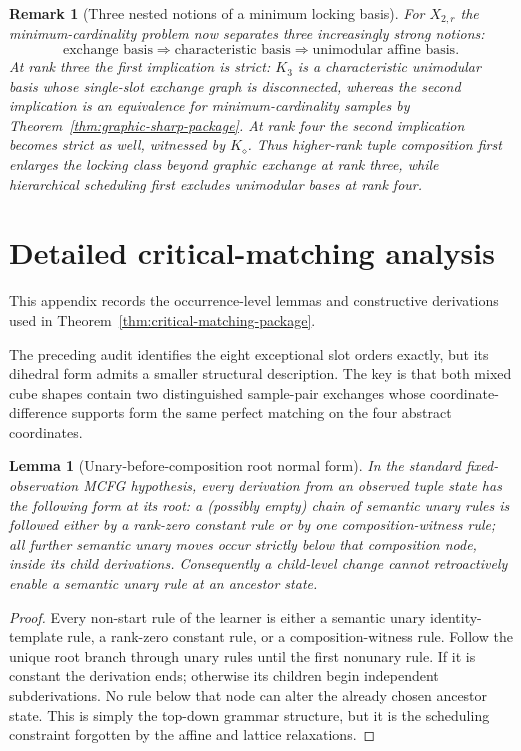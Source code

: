 \documentclass[11pt]{article}
\newtheorem{lemma}[definition]{Lemma}
\newtheorem{remark}[definition]{Remark}
\begin{document}
\begin{remark}[Three nested notions of a minimum locking basis]
For $X_{2,r}$ the minimum-cardinality problem now separates three increasingly
strong notions:
\[
 \text{exchange basis}
 \Longrightarrow
 \text{characteristic basis}
 \Longrightarrow
 \text{unimodular affine basis}.
\]
At rank three the first implication is strict: $K_3$ is a
characteristic unimodular basis whose single-slot exchange graph is disconnected,
whereas the second implication is an equivalence for minimum-cardinality
samples by Theorem~\ref{thm:graphic-sharp-package}.  At rank four the second
implication becomes strict as well, witnessed by $K_{\diamond}$.  Thus higher-rank tuple composition first enlarges the locking
class beyond graphic exchange at rank three, while hierarchical scheduling
first excludes unimodular bases at rank four.
\end{remark}




\section{Detailed critical-matching analysis}
\label{app:critical-matching-details}
This appendix records the occurrence-level lemmas and constructive derivations
used in Theorem~\ref{thm:critical-matching-package}.


The preceding audit identifies the eight exceptional slot orders exactly, but
its dihedral form admits a smaller structural description.  The key is that
both mixed cube shapes contain two distinguished sample-pair exchanges whose
coordinate-difference supports form the same perfect matching on the four
abstract coordinates.

\begin{lemma}[Unary-before-composition root normal form]
\label{lem:unary-before-composition}
In the standard fixed-observation MCFG hypothesis, every derivation from an
observed tuple state has the following form at its root: a (possibly empty)
chain of semantic unary rules is followed either by a rank-zero constant rule
or by one composition-witness rule; all further semantic unary moves
occur strictly below that composition node, inside its child derivations.
Consequently a child-level change cannot retroactively enable a semantic unary
rule at an ancestor state.
\end{lemma}

\begin{proof}
Every non-start rule of the learner is either a semantic unary identity-template
rule, a rank-zero constant rule, or a composition-witness rule.  Follow
the unique root branch through unary rules until the first nonunary rule.  If it
is constant the derivation ends; otherwise its children begin independent
subderivations.  No rule below that node can alter the already chosen ancestor
state.  This is simply the top-down grammar structure, but it is the scheduling
constraint forgotten by the affine and lattice relaxations.
\end{proof}
\end{document}
